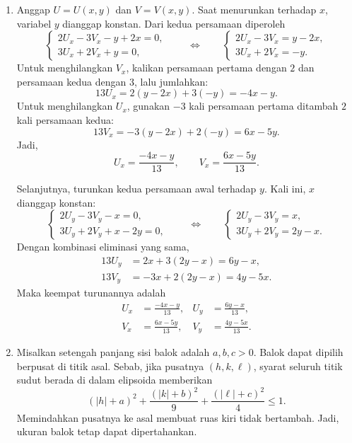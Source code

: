 \documentclass[11pt,a4paper]{article}
\begin{document}
\begin{enumerate}[itemsep=12pt,parsep=5pt]
  \item Anggap $U=U(x,y)$ dan $V=V(x,y)$.
        Saat menurunkan terhadap $x$, variabel $y$ dianggap konstan.
        Dari kedua persamaan diperoleh
        \[
          \begin{cases}
            2U_x-3V_x-y+2x=0, \\
            3U_x+2V_x+y=0,
          \end{cases}
          \qquad\Longleftrightarrow\qquad
          \begin{cases}
            2U_x-3V_x=y-2x, \\
            3U_x+2V_x=-y.
          \end{cases}
        \]
        Untuk menghilangkan $V_x$, kalikan persamaan pertama dengan $2$
        dan persamaan kedua dengan $3$, lalu jumlahkan:
        \[
          13U_x=2(y-2x)+3(-y)=-4x-y.
        \]
        Untuk menghilangkan $U_x$, gunakan $-3$ kali persamaan pertama
        ditambah $2$ kali persamaan kedua:
        \[
          13V_x=-3(y-2x)+2(-y)=6x-5y.
        \]
        Jadi,
        \[
          U_x=\frac{-4x-y}{13},\qquad V_x=\frac{6x-5y}{13}.
        \]

        Selanjutnya, turunkan kedua persamaan awal terhadap $y$.
        Kali ini, $x$ dianggap konstan:
        \[
          \begin{cases}
            2U_y-3V_y-x=0, \\
            3U_y+2V_y+x-2y=0,
          \end{cases}
          \qquad\Longleftrightarrow\qquad
          \begin{cases}
            2U_y-3V_y=x, \\
            3U_y+2V_y=2y-x.
          \end{cases}
        \]
        Dengan kombinasi eliminasi yang sama,
        \begin{align*}
          13U_y & =2x+3(2y-x)=6y-x,   \\
          13V_y & =-3x+2(2y-x)=4y-5x.
        \end{align*}
        Maka keempat turunannya adalah
        \[
          \boxed{
            \begin{aligned}
              U_x & =\frac{-4x-y}{13}, & U_y & =\frac{6y-x}{13},  \\[3pt]
              V_x & =\frac{6x-5y}{13}, & V_y & =\frac{4y-5x}{13}.
            \end{aligned}}
        \]

  \item Misalkan setengah panjang sisi balok adalah $a,b,c>0$.
        Balok dapat dipilih berpusat di titik asal.
        Sebab, jika pusatnya $(h,k,\ell)$, syarat seluruh titik sudut berada
        di dalam elipsoida memberikan
        \[
          (|h|+a)^2+\frac{(|k|+b)^2}{9}
          +\frac{(|\ell|+c)^2}{4}\le1.
        \]
        Memindahkan pusatnya ke asal membuat ruas kiri tidak bertambah.
        Jadi, ukuran balok tetap dapat dipertahankan.


\end{enumerate}
\end{document}

